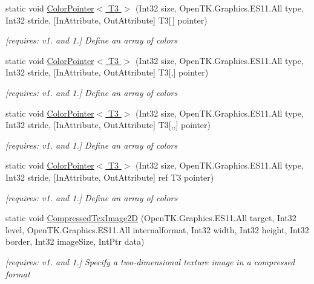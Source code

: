 \begin{DoxyCompactItemize}
static void \hyperlink{class_open_t_k_1_1_graphics_1_1_e_s11_1_1_g_l_a2d528f071eb703da05db0f9bba04ad71}{Color\-Pointer$<$ T3 $>$} (Int32 size, Open\-T\-K.\-Graphics.\-E\-S11.\-All type, Int32 stride, \mbox{[}In\-Attribute, Out\-Attribute\mbox{]} T3\mbox{[}$\,$\mbox{]} pointer)
\begin{DoxyCompactList}\small\item\em \mbox{[}requires\-: v1. and 1.\mbox{]} Define an array of colors \end{DoxyCompactList}\item 
static void \hyperlink{class_open_t_k_1_1_graphics_1_1_e_s11_1_1_g_l_a1cb5bdc0d82f278ea78a43d5b31d4a84}{Color\-Pointer$<$ T3 $>$} (Int32 size, Open\-T\-K.\-Graphics.\-E\-S11.\-All type, Int32 stride, \mbox{[}In\-Attribute, Out\-Attribute\mbox{]} T3\mbox{[},\mbox{]} pointer)
\begin{DoxyCompactList}\small\item\em \mbox{[}requires\-: v1. and 1.\mbox{]} Define an array of colors \end{DoxyCompactList}\item 
static void \hyperlink{class_open_t_k_1_1_graphics_1_1_e_s11_1_1_g_l_abd3efe27caac511d53ace7755a7c10f5}{Color\-Pointer$<$ T3 $>$} (Int32 size, Open\-T\-K.\-Graphics.\-E\-S11.\-All type, Int32 stride, \mbox{[}In\-Attribute, Out\-Attribute\mbox{]} T3\mbox{[},,\mbox{]} pointer)
\begin{DoxyCompactList}\small\item\em \mbox{[}requires\-: v1. and 1.\mbox{]} Define an array of colors \end{DoxyCompactList}\item 
static void \hyperlink{class_open_t_k_1_1_graphics_1_1_e_s11_1_1_g_l_a5b1e2504b3482939a90839e713753415}{Color\-Pointer$<$ T3 $>$} (Int32 size, Open\-T\-K.\-Graphics.\-E\-S11.\-All type, Int32 stride, \mbox{[}In\-Attribute, Out\-Attribute\mbox{]} ref T3 pointer)
\begin{DoxyCompactList}\small\item\em \mbox{[}requires\-: v1. and 1.\mbox{]} Define an array of colors \end{DoxyCompactList}\item 
static void \hyperlink{class_open_t_k_1_1_graphics_1_1_e_s11_1_1_g_l_a25b214686be0bdab1e036d35b297e23f}{Compressed\-Tex\-Image2\-D} (Open\-T\-K.\-Graphics.\-E\-S11.\-All target, Int32 level, Open\-T\-K.\-Graphics.\-E\-S11.\-All internalformat, Int32 width, Int32 height, Int32 border, Int32 image\-Size, Int\-Ptr data)
\begin{DoxyCompactList}\small\item\em \mbox{[}requires\-: v1. and 1.\mbox{]} Specify a two-\/dimensional texture image in a compressed format \end{DoxyCompactList}\item 

\end{DoxyCompactItemize}
